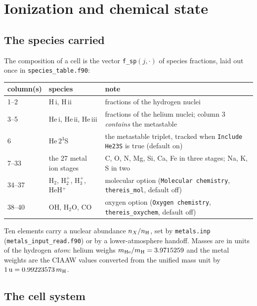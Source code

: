 \section{Ionization and chemical state}
\label{sec:ionization}

\subsection{The species carried}
\label{sec:ionization:species}

The composition of a cell is the vector \texttt{f\_sp}$(j,\cdot)$ of species
fractions, laid out once in \texttt{species\_table.f90}:

\begin{center}
\begin{tabular}{llp{}}
\toprule
column(s) & species & note\\
\midrule
1--2   & H\,{\sc i}, H\,{\sc ii} & fractions of the hydrogen nuclei\\
3--5   & He\,{\sc i}, He\,{\sc ii}, He\,{\sc iii} & fractions of the helium
         nuclei; column 3 \emph{contains} the metastable\\
6      & He\,$2^3$S & the metastable triplet, tracked when
         \texttt{Include He23S} is true (default on)\\
7--33  & the 27 metal ion stages & C, O, N, Mg, Si, Ca, Fe in three stages;
         Na, K, S in two\\
34--37 & H$_2$, H$_2^+$, H$_3^+$, HeH$^+$ & molecular option
         (\texttt{Molecular chemistry}, \texttt{thereis\_mol}, default off)\\
38--40 & OH, H$_2$O, CO & oxygen option (\texttt{Oxygen chemistry},
         \texttt{thereis\_oxychem}, default off)\\
\bottomrule
\end{tabular}
\end{center}

Ten elements carry a nuclear abundance $n_X/n_{\rm H}$, set by
\texttt{metals.inp} (\texttt{metals\_input\_read.f90}) or by a
lower-atmosphere handoff. Masses are in units of the hydrogen \emph{atom}:
helium weighs $m_{\rm He}/m_{\rm H} = 3.9715259$ and the metal weights are
the CIAAW values converted from the unified mass unit by
$1\,{\rm u} = 0.99223573\,m_{\rm H}$.

\subsection{The cell system}
\label{sec:ionization:cellsystem}

